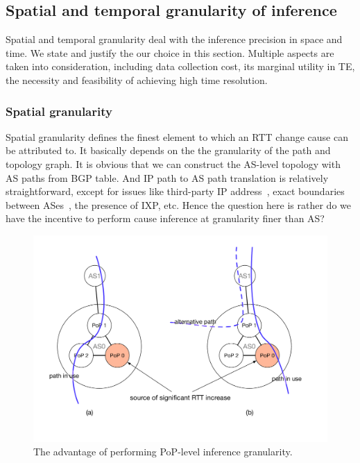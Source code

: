 \subsection{Spatial and temporal granularity of inference}
Spatial and temporal granularity deal with the inference precision in space and time.
We state and justify the our choice in this section. Multiple aspects are taken into consideration, including data collection cost, its marginal utility in TE, the necessity and feasibility of achieving high time resolution.

\subsubsection{Spatial granularity}
\label{sec:chap5_spatial}
Spatial granularity defines the finest element to which an RTT change cause can be attributed to.
It basically depends on the the granularity of the path and topology graph. 
It is obvious that we can construct the AS-level topology with AS paths from BGP table.
And IP path to AS path translation is relatively straightforward, except for issues like third-party IP address~\cite{Hyun2003, Luckie2014a, Zhang2010}, exact boundaries between ASes~\cite{Luckie2016}, the presence of IXP\cite{Nomikos2016}, etc.
Hence the question here is rather do we have the incentive to perform cause inference at granularity finer than AS?

\begin{figure}[!htb]
\centering
\includegraphics[width=.9\textwidth]{gfx/chap5/case_pop_topo.pdf}
\caption{The advantage of performing PoP-level inference granularity.}
\label{fig:chap5_case_pop_topo}
\end{figure}

